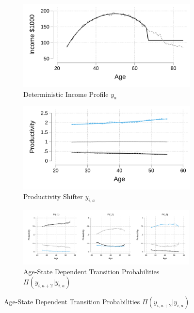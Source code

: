 \documentclass[12pt]{article}
\begin{document}
\begin{figure}\caption{Calibrated Income Process}\label{fig:calincome}
	\begin{subfigure}{0.49\textwidth}\caption{Deterministic Income Profile $y_a$}\label{fig:y_a}
		\includegraphics[width=\textwidth]{../tabfig/empirical/lifecycleincome.pdf}%
	\end{subfigure} %
	\begin{subfigure}{0.49\textwidth}\caption{Productivity Shifter $y_{i,a}$}\label{fig:y_ia}
		\includegraphics[width=\textwidth]{../tabfig/empirical/lifecycleproductivity_3.pdf}
	\end{subfigure}

	\begin{subfigure}{\textwidth}\caption{Age-State Dependent Transition Probabilities $\Pi(y_{i,a+2}|y_{i,a})$}\label{fig:Piv}
		\includegraphics[width=0.99\textwidth]{../tabfig/empirical/Pi_vk_3.pdf} 


\end{subfigure}
\end{figure}
\end{document}
